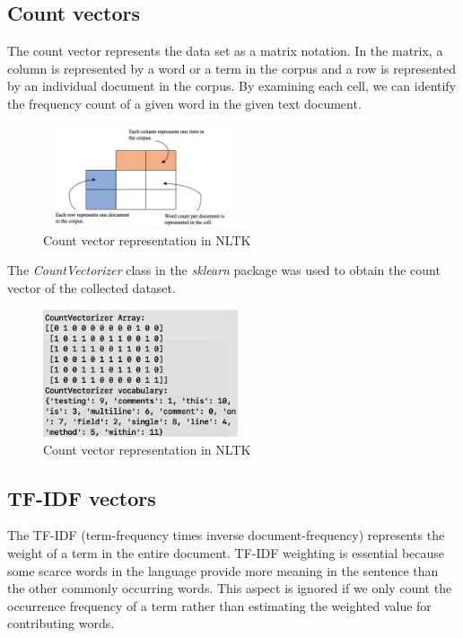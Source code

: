 \documentclass[conference]{IEEEtran}
\begin{document}
\subsection{Count vectors}

The count vector represents the data set as a matrix notation. In the matrix, a column is represented by a word or a term in the corpus and a row is represented by an individual document in the corpus. By examining each cell, we can identify the frequency count of a given word in the given text document.

\begin{figure}[!h]
\centerline{\includegraphics[width=5.75cm, height=3cm]{graphics/pic-1.png}}
\caption{Count vector representation in NLTK}
\label{fig}
\end{figure}
 
The \textit{CountVectorizer} class in the \textit{sklearn} package was used to obtain the count vector of the collected dataset.

\begin{figure}[!h]
\centerline{\includegraphics[width=5.75cm, height=3.75cm]{graphics/count-vec.png}}
\caption{Count vector representation in NLTK}
\label{fig}
\end{figure}

\subsection{TF-IDF vectors}

The TF-IDF (term-frequency times inverse document-frequency) represents the weight of a term in the entire document. TF-IDF weighting is essential because some scarce words in the language provide more meaning in the sentence than the other commonly occurring words. This aspect is ignored if we only count the occurrence frequency of a term rather than estimating the weighted value for contributing words.  
\end{document}
